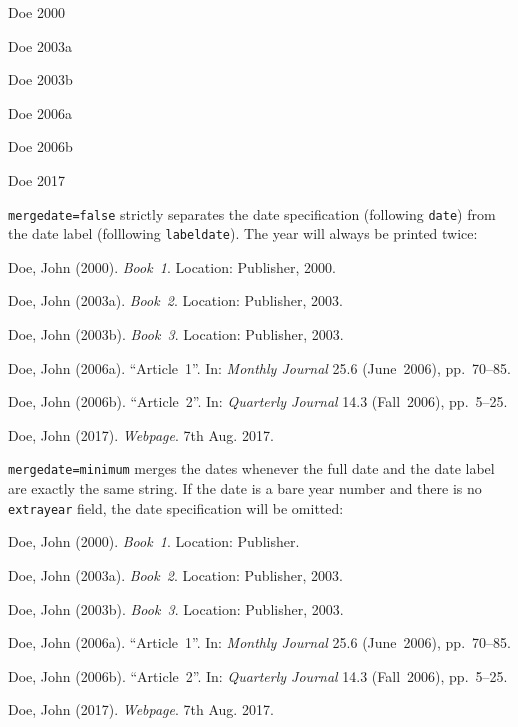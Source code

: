 \documentclass[a4paper]{article}
\newenvironment{bibsample}
  {\trivlist\samepage
   \setlength{\itemsep}{0pt}}
  {\endtrivlist}
\begin{document}
\begin{bibsample}
\item Doe 2000
\item Doe 2003a
\item Doe 2003b
\item Doe 2006a
\item Doe 2006b
\item Doe 2017
\end{bibsample}

\texttt{mergedate=false} strictly separates the date specification
(following \texttt{date}) from the date label (folllowing \texttt{labeldate}).
The year will always be printed twice:

\begin{bibsample}
\item Doe, John (2000). \emph{Book~1}. Location: Publisher, 2000.
\item Doe, John (2003a). \emph{Book~2}. Location: Publisher, 2003.
\item Doe, John (2003b). \emph{Book~3}. Location: Publisher, 2003.
\item Doe, John (2006a). \enquote{Article~1}. In: \emph{Monthly Journal} 25.6
(June~2006), pp.~70--85.
\item Doe, John (2006b). \enquote{Article~2}. In: \emph{Quarterly Journal} 14.3
(Fall~2006), pp.~5--25.
\item Doe, John (2017). \emph{Webpage}. 7th Aug. 2017.
\end{bibsample}

\texttt{mergedate=minimum} merges the dates whenever the full date
and the date label are exactly the same string. If the date is a bare
year number and there is no \texttt{extrayear} field, the date
specification will be omitted:

\begin{bibsample}
\item Doe, John (2000). \emph{Book~1}. Location: Publisher.
\item Doe, John (2003a). \emph{Book~2}. Location: Publisher, 2003.
\item Doe, John (2003b). \emph{Book~3}. Location: Publisher, 2003.
\item Doe, John (2006a). \enquote{Article~1}. In: \emph{Monthly Journal} 25.6
(June~2006), pp.~70--85.
\item Doe, John (2006b). \enquote{Article~2}. In: \emph{Quarterly Journal} 14.3
(Fall~2006), pp.~5--25.
\item Doe, John (2017). \emph{Webpage}. 7th Aug. 2017.
\end{bibsample}
\end{document}

